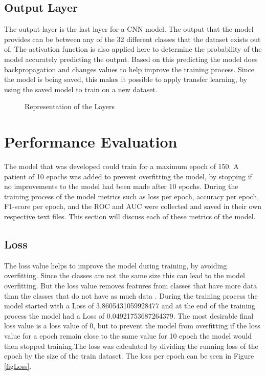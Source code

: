 \documentclass[a4paper,oneside,11pt]{book}
\begin{document}
\newpage
\section{Output Layer}

The output layer is the last layer for a CNN model. The output that the model provides can be between any of the 32 different classes that the dataset exists out of. The activation function is also applied here to determine the probability of the model accurately predicting the output. Based on this predicting the model does backpropagation and changes values to help improve the training process. Since the model is being saved, this makes it possible to apply transfer learning, by using the saved model to train on a new dataset.

\begin{figure}[h]
    \centering
    \caption{Representation of the Layers}
\end{figure}

\chapter[Performance Evaluation]{Performance Evaluation}

The model that was developed could train for a maximum epoch of 150. A patient of 10 epochs was added to prevent overfitting the model, by stopping if no improvements to the model had been made after 10 epochs. During the training process of the model metrics such as loss per epoch, accuracy per epoch, F1-score per epoch, and the ROC and AUC were collected and saved in their own respective text files. This section will discuss each of these metrics of the model.

\section{Loss}

The loss value helps to improve the model during training, by avoiding overfitting. Since the classes are not the same size this can lead to the model overfitting. But the loss value removes features from classes that have more data than the classes that do not have as much data \citep{pham2021ai}. During the training process the model started with a Loss of 3.8605431059928477 and at the end of the training process the model had a Loss of 0.04921753687264379. The most desirable final loss value is a loss value of 0, but to prevent the model from overfitting if the loss value for a epoch remain close to the same value for 10 epoch the model would then stopped training.The loss was calculated by dividing the running loss of the epoch by the size of the train dataset. The loss per epoch can be seen in Figure \ref{figLoss}.
\end{document}
